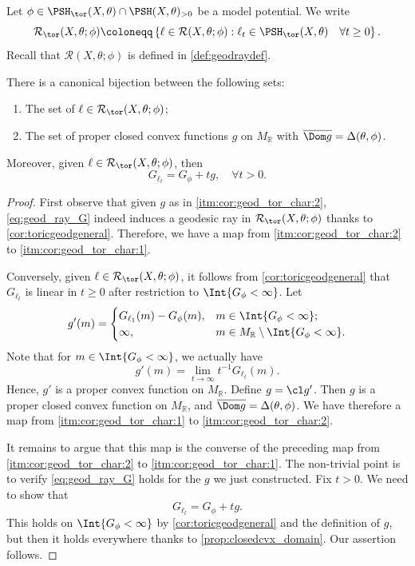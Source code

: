 Let $\phi\in \PSH_{\tor}(X,\theta)\cap \PSH(X,\theta)_{>0}$ be a model potential. We write
\[
\mathcal{R}_{\tor}(X,\theta;\phi)\coloneqq \left\{ \ell\in \mathcal{R}(X,\theta;\phi): \ell_t\in \PSH_{\tor}(X,\theta)\quad\forall t\geq 0\right\}.
\]
Recall that $\mathcal{R}(X,\theta;\phi)$ is defined in \cref{def:geodraydef}.
\begin{corollary}\label{cor:geod_tor_char}
There is a canonical bijection between the following sets:
\begin{enumerate}
    \item\label{itm:cor:geod_tor_char:1} The set of $\ell\in \mathcal{R}_{\tor}(X,\theta;\phi)$;
    \item\label{itm:cor:geod_tor_char:2} The set of proper closed convex functions $g$ on $M_{\mathbb{R}}$ with $\overline{\Dom g}=\Delta(\theta,\phi)$.
\end{enumerate}
Moreover, given $\ell\in \mathcal{R}_{\tor}(X,\theta;\phi)$, then
\begin{equation}\label{eq:geod_ray_G}
G_{\ell_t}=G_{\phi}+tg,\quad \forall t>0.
\end{equation}
\end{corollary}
\begin{proof}
    First observe that given $g$ as in \ref{itm:cor:geod_tor_char:2}, \eqref{eq:geod_ray_G} indeed induces a geodesic ray in $\mathcal{R}_{\tor}(X,\theta;\phi)$ thanks to \cref{cor:toricgeodgeneral}. Therefore, we have a map from \ref{itm:cor:geod_tor_char:2} to \ref{itm:cor:geod_tor_char:1}.

    Conversely, given $\ell\in \mathcal{R}_{\tor}(X,\theta;\phi)$, it follows from \cref{cor:toricgeodgeneral} that $G_{\ell_t}$ is linear in $t\geq 0$ after restriction to $\Int \{G_{\phi}<\infty\}$. Let
    \[
    g'(m)=
    \begin{cases}
    G_{\ell_1}(m)-G_{\phi}(m),& m\in \Int \{G_{\phi}<\infty\};\\
    \infty,& m\in M_{\mathbb{R}}\setminus \Int \{G_{\phi}<\infty\}.
    \end{cases}
    \]
    Note that for $m\in \Int \{G_{\phi}<\infty\}$, we actually have
    \[
    g'(m)=\lim_{t\to\infty}t^{-1}G_{\ell_t}(m).
    \]
    Hence, $g'$ is a proper convex function on $M_{\mathbb{R}}$.
    Define $g=\cl g'$. Then $g$ is a proper closed convex function on $M_{\mathbb{R}}$, and $\overline{\Dom g}=\Delta(\theta,\phi)$.
    We have therefore a map from \ref{itm:cor:geod_tor_char:1} to \ref{itm:cor:geod_tor_char:2}.

    It remains to argue that this map is the converse of the preceding map from \ref{itm:cor:geod_tor_char:2} to \ref{itm:cor:geod_tor_char:1}. The non-trivial point is to verify \eqref{eq:geod_ray_G} holds for the $g$ we just constructed. Fix $t>0$. We need to show that
    \[
    G_{\ell_t}=G_{\phi}+tg.
    \]
    This holds on $\Int \{G_{\phi}<\infty\}$ by \cref{cor:toricgeodgeneral} and the definition of $g$, but then it holds everywhere thanks to \cref{prop:closedcvx_domain}. Our assertion follows.
\end{proof}

